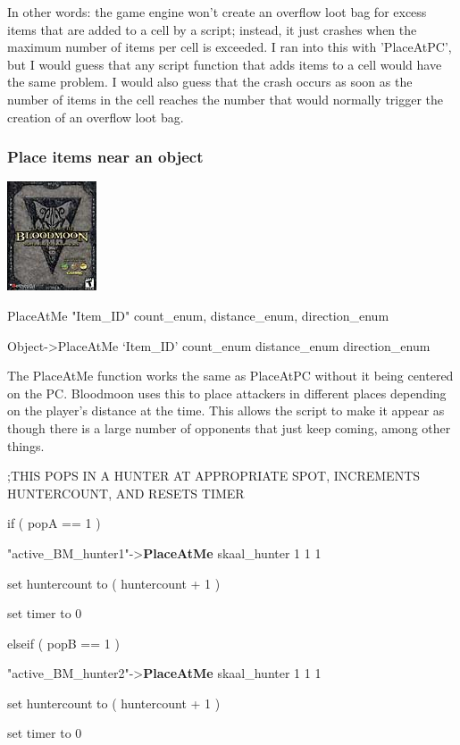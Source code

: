 \documentclass[
]{article}
\begin{document}
In other words: the game engine won't create an overflow loot bag for
excess items that are added to a cell by a script; instead, it just
crashes when the maximum number of items per cell is exceeded. I ran
into this with 'PlaceAtPC', but I would guess that any script function
that adds items to a cell would have the same problem. I would also
guess that the crash occurs as soon as the number of items in the cell
reaches the number that would normally trigger the creation of an
overflow loot bag.

\hypertarget{place-items-near-an-object}{%
\subsubsection{Place items near an
object}\label{place-items-near-an-object}}

\includegraphics{media/image7.png}

PlaceAtMe "Item\_ID" count\_enum, distance\_enum, direction\_enum

Object-\textgreater PlaceAtMe `Item\_ID' count\_enum distance\_enum
direction\_enum

The PlaceAtMe function works the same as PlaceAtPC without it being
centered on the PC. Bloodmoon uses this to place attackers in different
places depending on the player's distance at the time. This allows the
script to make it appear as though there is a large number of opponents
that just keep coming, among other things.

;THIS POPS IN A HUNTER AT APPROPRIATE SPOT, INCREMENTS HUNTERCOUNT, AND
RESETS TIMER

if ( popA == 1 )

"active\_BM\_hunter1"-\textgreater{}\textbf{PlaceAtMe} skaal\_hunter 1 1
1

set huntercount to ( huntercount + 1 )

set timer to 0

elseif ( popB == 1 )

"active\_BM\_hunter2"-\textgreater{}\textbf{PlaceAtMe} skaal\_hunter 1 1
1

set huntercount to ( huntercount + 1 )

set timer to 0
\end{document}
